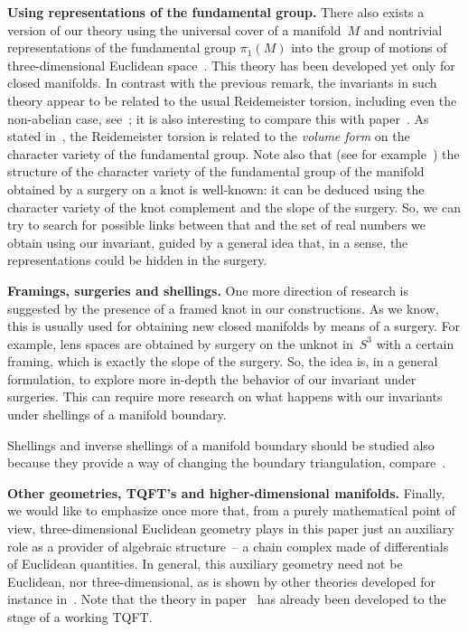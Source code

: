 \documentclass[pdftex]{sigma}
\begin{document}
{\bf Using representations of the fundamental group.} There also exists a version of our theory using the universal cover of a manifold~$M$ and nontrivial representations of the fundamental group $\pi_1(M)$ into the group of motions
of three-dimensional Euclidean space~\cite{KM,M,M-thesis}. This theory has been developed
yet only for closed manifolds. In contrast with the previous remark, the invariants in such
theory appear to be related to the usual Reidemeister torsion, including even the
non-abelian case, see~\cite{M}; it is also interesting to compare this with
paper~\cite{JDFourier}. As stated in~\cite{JDFourier}, the Reidemeister torsion is related
to the \emph{volume form} on the character variety of the fundamental group. Note also that
(see for example~\cite{K}) the structure of the character variety of the fundamental group
of the manifold obtained by a surgery on a knot is well-known: it can be deduced using the
character variety of the knot complement and the slope of the surgery. So, we can try to
search for possible links between that and the set of real numbers we obtain using our
invariant, guided by a general idea that, in a sense, the representations could be hidden in
the surgery.



{\bf Framings, surgeries and shellings.} One more direction of research is suggested by the presence of a framed knot in our
constructions. As we know, this is usually used for obtaining new closed manifolds by means
of a surgery. For example, lens spaces are obtained by surgery on the unknot in~$S^3$ with a
certain framing, which is exactly the slope of the surgery. So, the idea is, in a general
formulation, to explore more in-depth the behavior of our invariant under surgeries. This
can require more research on what happens with our invariants under shellings of a manifold
boundary.

Shellings and inverse shellings of a manifold boundary should be studied also because they
provide a way of changing the boundary triangulation,
compare~\cite[Section~4]{korepanov-2009-1}.



{\bf Other geometries, TQFT's and higher-dimensional manifolds.} Finally, we would like to emphasize once more that, from a purely mathematical point of view, three-dimensional Euclidean geometry plays in this paper just an auxiliary role as a provider of algebraic structure~-- a chain complex made of dif\/ferentials of Euclidean quantities. In general, this auxiliary geometry need not be Euclidean, nor three-dimensional, as is shown by other theories developed for instance in~\cite{SL2,3dim4geo,KKM,BKM}. Note that the theory in paper~\cite{BKM} has already been developed to the stage of a working TQFT.
\end{document}
